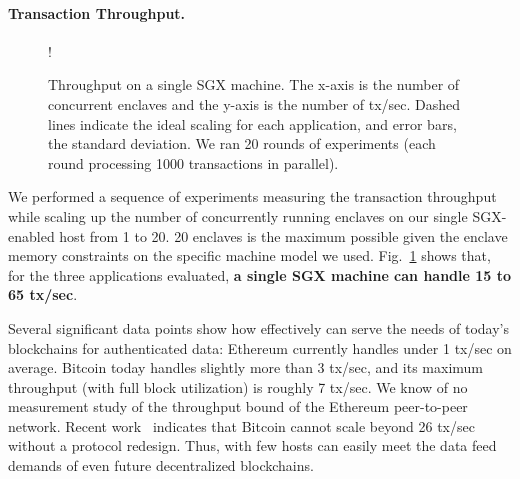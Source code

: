 \paragraph{Transaction Throughput.}
\begin{figure}[h]
  \resizebox {\columnwidth} {!}{
}
\caption{Throughput on a single SGX machine.  The x-axis is the number of
concurrent enclaves and the y-axis is the number of tx/sec. 
Dashed lines indicate the ideal scaling for each application, and error bars, the standard deviation.
We ran 20 rounds of experiments (each round processing 1000
transactions in parallel).}

\label{fig:trpt}
\end{figure}
We performed a sequence of experiments measuring the transaction throughput while scaling up the number of concurrently running enclaves 
on our single SGX-enabled host from 1 to 20. 20 \tc enclaves is the maximum possible given the enclave memory constraints on the specific machine model we used.
Fig.~\ref{fig:trpt} shows that, for the three applications evaluated,
{\bf a single SGX machine can handle
15 to 65
tx/sec}. 

Several significant data points show
how effectively \tc can serve the needs of 
today's blockchains for authenticated data: 
Ethereum currently handles under 1 tx/sec on average.
Bitcoin today handles slightly more than
3 tx/sec, and 
its maximum throughput (with full block utilization)
is roughly 7 tx/sec.
We know of no measurement study of the
throughput bound of the Ethereum  peer-to-peer network.
Recent work~\cite{blockchainscaling} indicates that Bitcoin cannot scale beyond 26 tx/sec without a protocol redesign.
Thus, with few hosts \tc can easily meet the data feed demands of  
even future decentralized blockchains.



